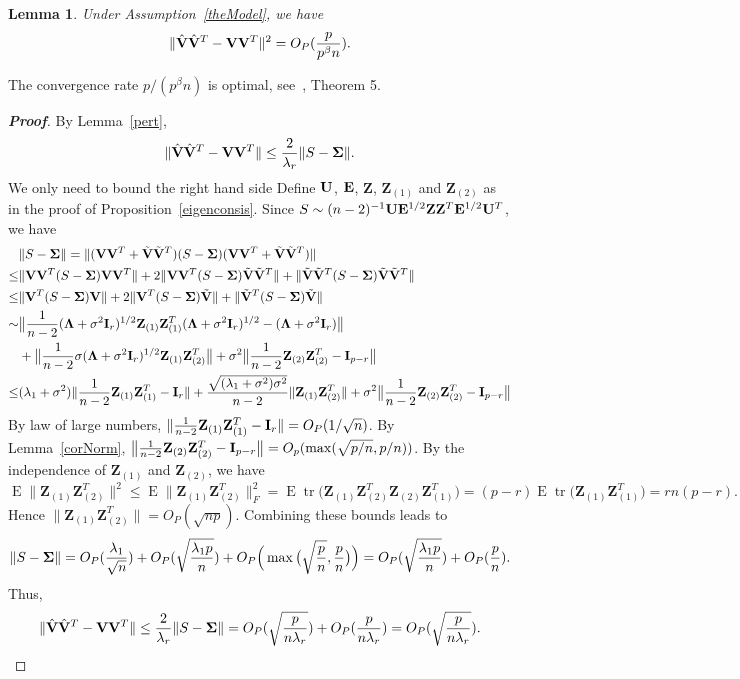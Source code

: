 \documentclass[review]{elsarticle}
\DeclareMathOperator{\mytr}{tr}
\DeclareMathOperator{\myE}{E}
\newcommand{\bZ}{\mathbf{Z}}
\theoremstyle{plain}
\newtheorem{lemma}{\quad\quad Lemma}
\theoremstyle{definition}
\theoremstyle{remark}
\begin{document}
\begin{lemma}\label{conRateLemma}
    Under Assumption~\ref{theModel}, we have
\begin{equation*}
\|\hat{\mathbf{V}}\hat{\mathbf{V}}^T-\mathbf{V}\mathbf{V}^T\|^2 =O_P(\frac{p}{p^{\beta}n}).
\end{equation*}
\end{lemma}
The convergence rate $p/(p^{\beta}n)$ is optimal, see~\cite{Cai2012Sparse}, Theorem 5.
{\color{red}
\begin{proof}[\textbf{Proof}]
    By Lemma~\ref{pert},
    $$
    \|\hat{\mathbf{V}}\hat{\mathbf{V}}^T - \mathbf{V}\mathbf{V} ^T\|\leq \frac{2}{\lambda_r}\|S-\boldsymbol{\Sigma}\|.
    $$
    We only need to bound the right hand side
    Define $\mathbf{U}$, $\mathbf{E}$, $\bZ$, $\bZ_{(1)}$ and $\bZ_{(2)}$ as in the proof of Proposition~\ref{eigenconsis}.
    Since $S\sim (n-2)^{-1}\BU\BE^{1/2}\bZ \bZ^T \BE^{1/2} \BU^T$, we have
    $$
    \begin{aligned}
        &\|S-\bSigma\|=
        \|(\BV\BV^T+\tilde{\BV}\tilde{\BV}^T)(S-\bSigma)(\BV\BV^T+\tilde{\BV}\tilde{\BV}^T)\|\\
        \leq& \|\BV\BV^T (S-\bSigma) \BV\BV^T\|+2 \|\BV\BV^T (S-\bSigma) \tilde{\BV}\tilde{\BV}^T\|+\|\tilde{\BV}\tilde{\BV}^T (S-\bSigma) \tilde{\BV}\tilde{\BV}^T\|\\
        \leq& \|\BV^T (S-\bSigma) \BV\|+2 \|\BV^T (S-\bSigma) \tilde{\BV}\|+\|\tilde{\BV}^T (S-\bSigma) \tilde{\BV}\|\\
        \sim &
        \big\|\frac{1}{n-2}(\bLambda+\sigma^2 \BI_r)^{1/2}\bZ_{(1)} \bZ_{(1)}^T(\bLambda+\sigma^2 \BI_r)^{1/2}-(\bLambda+\sigma^2 \BI_r)\big\|\\
        &+
        \big\|\frac{1}{n-2}\sigma(\bLambda+\sigma^2 \BI_r)^{1/2}\bZ_{(1)} \bZ_{(2)}^T\big\|+
        \sigma^2\big\|\frac{1}{n-2}\bZ_{(2)} \bZ_{(2)}^T- \BI_{p-r}\big\|\\
        \leq & (\lambda_1+\sigma^2) \|\frac{1}{n-2}\bZ_{(1)}\bZ_{(1)}^T-\BI_r\|
        +\frac{\sqrt{(\lambda_1+\sigma^2)\sigma^2}}{n-2}\|\bZ_{(1)}\bZ_{(2)}^T\|+
        \sigma^2\big\|\frac{1}{n-2}\bZ_{(2)} \bZ_{(2)}^T- \BI_{p-r}\big\|\\
    \end{aligned}
    $$
    By law of large numbers, $\|\frac{1}{n-2}\bZ_{(1)}\bZ_{(1)}^T-\BI_r\|=O_P(1/\sqrt{n})$.
    By Lemma~\ref{corNorm}, $\big\|\frac{1}{n-2}\bZ_{(2)} \bZ_{(2)}^T- \BI_{p-r}\big\|=O_p(\max(\sqrt{p/n},p/n))$.
    By the independence of $\bZ_{(1)}$ and $\bZ_{(2)}$, we have
    $$
    \myE \|\bZ_{(1)}\bZ_{(2)}^T\|^2\leq
    \myE \|\bZ_{(1)}\bZ_{(2)}^T\|_F^2
    =
    \myE \mytr\big(\bZ_{(1)}\bZ_{(2)}^T\bZ_{(2)}\bZ_{(1)}^T\big)
    =(p-r)
    \myE \mytr\big(\bZ_{(1)}\bZ_{(1)}^T\big)
    =rn(p-r).
    $$
    Hence $\|\bZ_{(1)}\bZ_{(2)}^T\|=O_P(\sqrt{np})$.
    Combining these bounds leads to
    $$
    \|S-\boldsymbol{\Sigma}\|=
    O_P(\frac{\lambda_1}{\sqrt{n}})+O_P(\sqrt{\frac{\lambda_1 p}{n}})+O_P\Big(\max\big(\sqrt{\frac{p}{n}},\frac{p}{n}\big)\Big)
    =
    O_P(\sqrt{\frac{\lambda_1 p}{n}})+O_P(\frac{p}{n}).
    $$
    Thus,
    $$
    \|\hat{\mathbf{V}}\hat{\mathbf{V}}^T- \mathbf{V}\mathbf{V}^T\|\leq \frac{2}{\lambda_r}\|S-\boldsymbol{\Sigma}\|=
    O_P(\sqrt{\frac{p}{n\lambda_r}})+O_P(\frac{p}{n\lambda_r})=
O_P(\sqrt{\frac{p}{n\lambda_r}}).
    $$

\end{proof}
}
\end{document}
